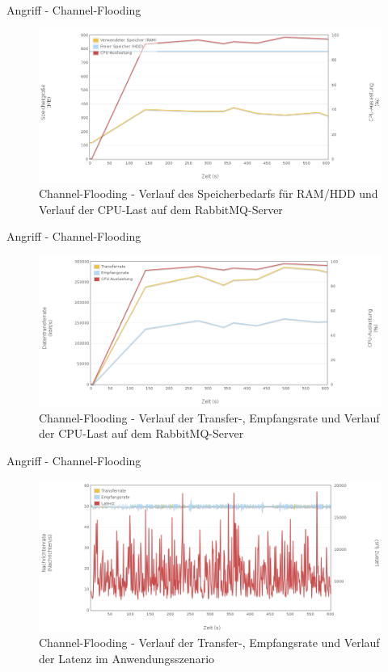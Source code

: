 \documentclass[10pt]{beamer}
\begin{document}
\begin{frame}{Angriff - Channel-Flooding}
\begin{figure}[!htb]
	\centering
	\includegraphics[width=\textwidth]{img/channel/channel_server1.png}
	\caption{\centering Channel-Flooding - Verlauf des Speicherbedarfs für RAM/HDD und Verlauf der CPU-Last auf dem RabbitMQ-Server}
	\label{fig:channel-server1}
\end{figure}
\end{frame}
	
\begin{frame}{Angriff - Channel-Flooding}
\begin{figure}[!htb]
	\centering
	\includegraphics[width=\textwidth]{img/channel/channel_server2.png}
	\caption{\centering Channel-Flooding - Verlauf der Transfer-, Empfangsrate und Verlauf der CPU-Last auf dem RabbitMQ-Server}
	\label{fig:channel-server2}
\end{figure}
\end{frame}

\begin{frame}{Angriff - Channel-Flooding}	
\begin{figure}[!htb]
	\centering
	\includegraphics[width=\textwidth]{img/channel/channel_scenario.png}
	\caption{\centering Channel-Flooding - Verlauf der Transfer-, Empfangsrate und Verlauf der Latenz im Anwendungsszenario}
	\label{fig:channel-scenario}
\end{figure}
\end{frame}
\end{document}
